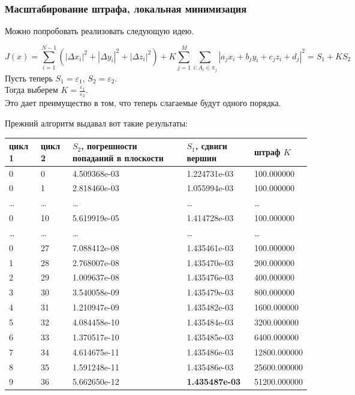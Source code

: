 \documentclass[a4paper,12pt, titlepage]{article}
\begin{document}
\subsubsection{Масштабирование штрафа, локальная минимизация}
\begin{flushleft}
 Можно попробовать реализовать следующую идею.
\end{flushleft}
\begin{flushleft}
$$	
	J(x) = \sum\limits_{i = 1}^{N - 1}(|\Delta x_{i}|^{2} + |\Delta y_{i}|^{2} + |\Delta z_{i}|^{2}) + 
	K\sum\limits_{j = 1}^{M}\sum\limits_{i: A_{i} \in \pi_{j}}
	|a_{j}x_{i} + b_{j}y_{i} + c_{j}z_{i} + d_{j}|^{2}  = 
	S_{1} + K S_{2}
$$
Пусть теперь $S_{1} = \varepsilon_{1}$, $S_{2} = \varepsilon_{2}$.\\
Тогда выберем $K = \frac{\varepsilon_{1}}{\varepsilon_{2}}$.\\
Это дает преимущество в том, что теперь слагаемые будут одного порядка.
\end{flushleft}
\begin{flushleft}
 Прежний алгоритм выдавал вот такие результаты: 
\end{flushleft}

\begin{flushleft}
\begin{tabular}{|p{1cm}|p{1cm}|p{4cm}|p{4cm}|p{3cm}|}

\hline 
 цикл 1 & цикл 2 & $S_{2}$, погрешности попаданий в плоскости & $S_{1}$, сдвиги вершин& штраф $K$ \\
\hline
 0 & 0 & 4.509368e-03 & 1.224731e-03 & 100.000000\\
\hline
 0 & 1 & 2.818460e-03 & 1.055994e-03 & 100.000000\\
\hline
 \dots & \dots & \dots & \dots & \dots\\
\hline
 0 & 10 & 5.619919e-05 & 1.414728e-03 & 100.000000\\
\hline
 \dots & \dots & \dots & \dots & \dots\\
\hline
 0 & 27 & 7.088412e-08 & 1.435461e-03 & 100.000000\\
\hline
 1 & 28 & 2.768007e-08 & 1.435470e-03 & 200.000000\\
\hline
 2 & 29 & 1.009637e-08 & 1.435476e-03 & 400.000000\\
\hline
 3 & 30 & 3.540058e-09 & 1.435479e-03 & 800.000000\\
\hline
 4 & 31 & 1.210947e-09 & 1.435482e-03 & 1600.000000\\
\hline
 5 & 32 & 4.084458e-10 & 1.435484e-03 & 3200.000000\\
\hline
 6 & 33 & 1.370517e-10 & 1.435485e-03 & 6400.000000\\
\hline
 7 & 34 & 4.614675e-11 & 1.435486e-03 & 12800.000000\\
\hline
 8 & 35 & 1.591248e-11 & 1.435486e-03 & 25600.000000\\
\hline
 9 & 36 & 5.662650e-12 & \textbf{1.435487e-03} & 51200.000000\\
\hline
\end{tabular}
\end{flushleft}
\end{document}
